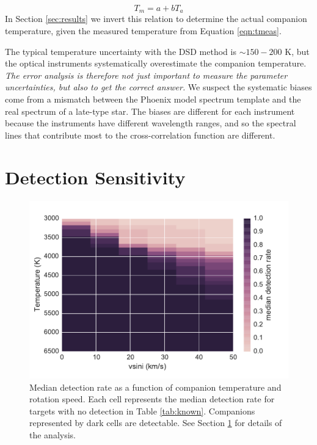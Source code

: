 \documentclass{emulateapj}
\begin{document}
\begin{equation}
T_m = a + bT_a
\end{equation}
In Section \ref{sec:results} we invert this relation to determine the actual companion temperature, given the measured temperature from Equation \ref{eqn:tmeas}.

The typical temperature uncertainty with the DSD method is $\sim 150 - 200$ K, but the optical instruments systematically overestimate the companion temperature. \emph{The error analysis is therefore not just important to measure the parameter uncertainties, but also to get the correct answer.} We suspect the systematic biases come from a mismatch between the Phoenix model spectrum template and the real spectrum of a late-type star. The biases are different for each instrument because the instruments have different wavelength ranges, and so the spectral lines that contribute most to the cross-correlation function are different. 



\section{Detection Sensitivity}
\label{subsec:sensitivity}



\begin{figure}
  \centering
  \includegraphics[width=\columnwidth]{vsini_temperature_detection_rate_median.pdf}
  \caption{Median detection rate as a function of companion temperature and rotation speed. Each cell represents the median detection rate for targets with no detection in Table \ref{tab:known}. Companions represented by dark cells are detectable. See Section \ref{subsec:sensitivity} for details of the analysis.}
  \label{fig:sensitivity_2d}
\end{figure}
\end{document}
